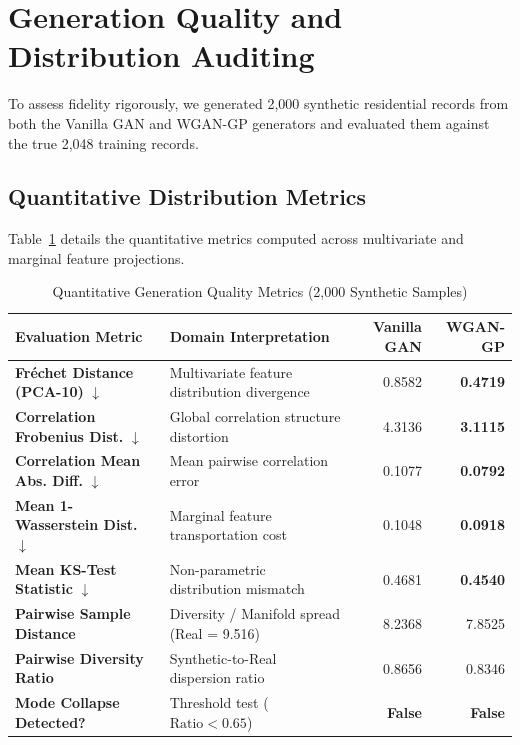 \documentclass[11pt,letterpaper]{article}
\begin{document}
\section{Generation Quality and Distribution Auditing}
To assess fidelity rigorously, we generated 2,000 synthetic residential records from both the Vanilla GAN and WGAN-GP generators and evaluated them against the true 2,048 training records.

\subsection{Quantitative Distribution Metrics}
Table~\ref{tab:quality_metrics} details the quantitative metrics computed across multivariate and marginal feature projections.

\begin{table}[H]
\centering
\caption{Quantitative Generation Quality Metrics (2,000 Synthetic Samples)}
\label{tab:quality_metrics}
\begin{tabular}{llrr}
\toprule
\textbf{Evaluation Metric} & \textbf{Domain Interpretation} & \textbf{Vanilla GAN} & \textbf{WGAN-GP} \\
\midrule
\textbf{Fr\'echet Distance (PCA-10)} $\downarrow$ & Multivariate feature distribution divergence & 0.8582 & \textbf{0.4719} \\
\textbf{Correlation Frobenius Dist.} $\downarrow$ & Global correlation structure distortion & 4.3136 & \textbf{3.1115} \\
\textbf{Correlation Mean Abs. Diff.} $\downarrow$ & Mean pairwise correlation error & 0.1077 & \textbf{0.0792} \\
\textbf{Mean 1-Wasserstein Dist.} $\downarrow$   & Marginal feature transportation cost & 0.1048 & \textbf{0.0918} \\
\textbf{Mean KS-Test Statistic} $\downarrow$     & Non-parametric distribution mismatch & 0.4681 & \textbf{0.4540} \\
\textbf{Pairwise Sample Distance}               & Diversity / Manifold spread (Real = 9.516) & 8.2368 & 7.8525 \\
\textbf{Pairwise Diversity Ratio}                & Synthetic-to-Real dispersion ratio & 0.8656 & 0.8346 \\
\textbf{Mode Collapse Detected?}                 & Threshold test ($\text{Ratio} < 0.65$) & \textbf{False} & \textbf{False} \\
\bottomrule
\end{tabular}
\end{table}
\end{document}
